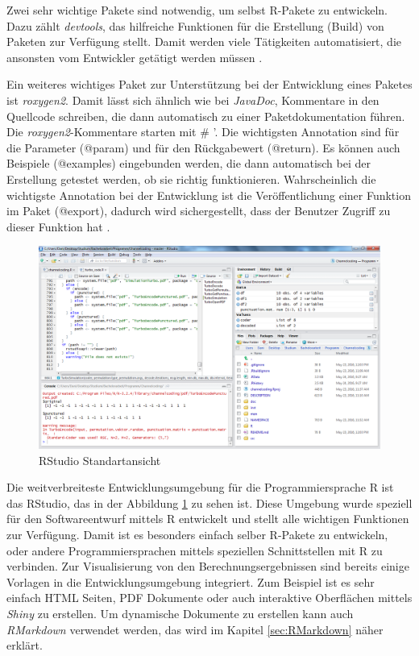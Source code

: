 Zwei sehr wichtige Pakete sind notwendig, um selbst R-Pakete zu entwickeln. Dazu zählt \emph{devtools}, das hilfreiche Funktionen für die Erstellung (Build) von Paketen zur Verfügung stellt. Damit werden viele Tätigkeiten automatisiert, die ansonsten vom Entwickler getätigt werden müssen \cite{devtools}.

Ein weiteres wichtiges Paket zur Unterstützung bei der Entwicklung eines Paketes ist \emph{roxygen2}. Damit lässt sich ähnlich wie bei \emph{JavaDoc}, Kommentare in den Quellcode schreiben, die dann automatisch zu einer Paketdokumentation führen. Die \emph{roxygen2}-Kommentare starten mit \# '. Die wichtigsten Annotation sind für die Parameter (@param) und für den Rückgabewert (@return). Es können auch Beispiele (@examples) eingebunden werden, die dann automatisch bei der Erstellung getestet werden, ob sie richtig funktionieren. Wahrscheinlich die wichtigste Annotation bei der Entwicklung ist die Veröffentlichung einer Funktion im Paket (@export), dadurch wird sichergestellt, dass der Benutzer Zugriff zu dieser Funktion hat \cite{roxygen}.

\begin{figure}[t]
\centering
\includegraphics[width=\ScaleIfNeeded]{pictures/RStudio}
\caption{RStudio Standartansicht}
\label{pic:RStudio}
\end{figure}

Die weitverbreiteste Entwicklungsumgebung für die Programmiersprache R ist das RStudio, das in der Abbildung \ref{pic:RStudio} zu sehen ist. Diese Umgebung wurde speziell für den Softwareentwurf mittels R entwickelt und stellt alle wichtigen Funktionen zur Verfügung. Damit ist es besonders einfach selber R-Pakete zu entwickeln, oder andere Programmiersprachen mittels speziellen Schnittstellen mit R zu verbinden. Zur Visualisierung von den Berechnungsergebnissen sind bereits einige Vorlagen in die Entwicklungsumgebung integriert. Zum Beispiel ist es sehr einfach HTML Seiten, PDF Dokumente oder auch interaktive Oberflächen mittels \emph{Shiny} zu erstellen. Um dynamische Dokumente zu erstellen kann auch \emph{RMarkdown} verwendet werden, das wird im Kapitel \ref{sec:RMarkdown} näher erklärt.

